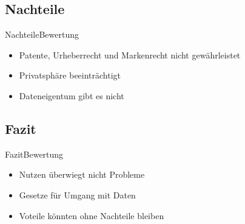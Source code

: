 \documentclass[10pt,a4paper]{beamer}
\begin{document}
\subsection{Nachteile}
\begin{frame}{Nachteile}{Bewertung}
\begin{itemize}
\item Patente, Urheberrecht und Markenrecht nicht gewährleistet
\item Privatsphäre beeinträchtigt
\item Dateneigentum gibt es nicht
\end{itemize}
\end{frame}

\subsection{Fazit}
\begin{frame}{Fazit}{Bewertung}
\begin{itemize}
\item Nutzen überwiegt nicht Probleme \pause
\item Gesetze für Umgang mit Daten \pause
\item Voteile könnten ohne Nachteile bleiben
\end{itemize}

\end{frame}
\begin{frame}
\titlepage
\end{frame}
\end{document}
